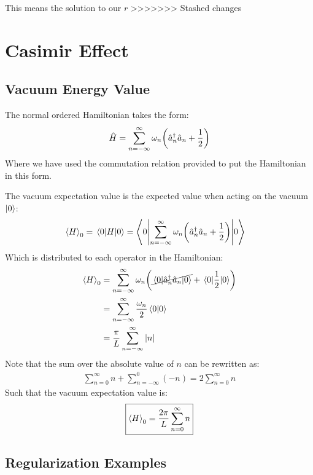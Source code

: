 \documentclass[12pt]{article}
\begin{document}
This means the solution to our $r$
>>>>>>> Stashed changes

\section{Casimir Effect}
\subsection{Vacuum Energy Value}
The normal ordered Hamiltonian takes the form:
\begin{align*}
  \hat{H}=\sum_{n=-\infty}^\infty\omega_n\qty(\hat{a}^\dag_n\hat{a}_n+\frac12)
\end{align*}
Where we have used the commutation relation provided to put the Hamiltonian in this form.

The vacuum expectation value is the expected value when acting on the vacuum $\ket{0}$:
\begin{align*}
  \ev{H}_0=\ev{H}{0}&=
  \ev**{\sum_{n=-\infty}^\infty\omega_n\qty(\hat{a}^\dag_n\hat{a}_n+\frac12)}{0}
\end{align*}
Which is distributed to each operator in the Hamiltonian:
\begin{align*}
  \ev{H}_0&=\sum_{n=-\infty}^\infty\omega_n
  \qty(\cancel{\ev{\hat{a}^\dag_n\hat{a}_n}{0}}+\ev{\frac12}{0})\\
  &=\sum_{n=-\infty}^\infty\frac{\omega_n}{2}\ip{0}\\
  &=\frac{\pi}{L}\sum_{n=-\infty}^\infty\abs{n}
\end{align*}
Note that the sum over the absolute value of $n$ can be rewritten as:
\begin{align*}
  \sum_{n=0}^\infty n+\sum_{n=-\infty}^0(-n)=2\sum_{n=0}^\infty n
\end{align*}
Such that the vacuum expectation value is:
\begin{align}
  \boxed{\ev{H}_0=\frac{2\pi}{L}\sum_{n=0}^\infty n}
\end{align}
\subsection{Regularization Examples}
\end{document}
